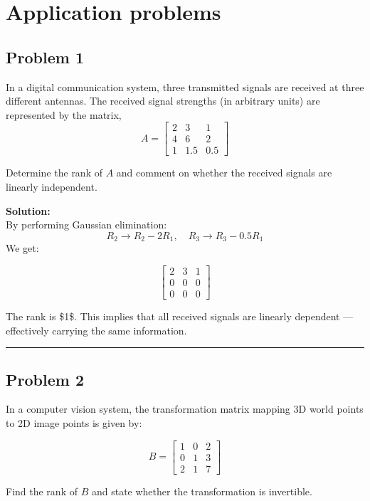 \documentclass[
  letterpaper,
  DIV=11,
  numbers=noendperiod]{scrreprt}
\begin{document}
\section{Application problems}\label{application-problems}

\subsection{Problem 1}\label{problem-1-1}

In a digital communication system, three transmitted signals are
received at three different antennas. The received signal strengths (in
arbitrary units) are represented by the matrix, \[
A =
\begin{bmatrix}
2 & 3 & 1 \\
4 & 6 & 2 \\
1 & 1.5 & 0.5
\end{bmatrix}
\]

Determine the rank of \(A\) and comment on whether the received signals
are linearly independent.

\textbf{Solution:}\\
By performing Gaussian elimination: \[
R_2 \to R_2 - 2R_1,\quad R_3 \to R_3 - 0.5R_1
\] We get:

\[
\begin{bmatrix}
2 & 3 & 1 \\
0 & 0 & 0 \\
0 & 0 & 0
\end{bmatrix}
\]

The rank is \$1\$. This implies that all received signals are linearly
dependent --- effectively carrying the same information.

\begin{center}\rule{0.5\linewidth}{0.5pt}\end{center}

\subsection{Problem 2}\label{problem-2-1}

In a computer vision system, the transformation matrix mapping 3D world
points to 2D image points is given by:

\[
B =
\begin{bmatrix}
1 & 0 & 2 \\
0 & 1 & 3 \\
2 & 1 & 7
\end{bmatrix}
\]

Find the rank of \(B\) and state whether the transformation is
invertible.
\end{document}
